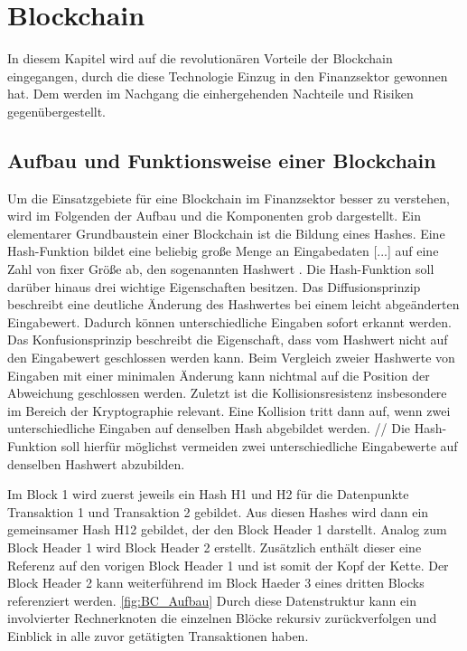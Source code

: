 \section{Blockchain}
In diesem Kapitel wird auf die revolutionären Vorteile der Blockchain 
eingegangen, durch die diese Technologie Einzug in den Finanzsektor gewonnen 
hat. Dem werden im Nachgang die einhergehenden Nachteile und Risiken gegenübergestellt. 

\subsection{Aufbau und Funktionsweise einer Blockchain}
Um die Einsatzgebiete für eine Blockchain im Finanzsektor besser zu verstehen,
wird im Folgenden der Aufbau und die Komponenten grob dargestellt.
Ein elementarer Grundbaustein einer Blockchain ist die Bildung eines Hashes.
\glqq Eine Hash-Funktion bildet eine beliebig große Menge an Eingabedaten [...] auf eine Zahl von 
fixer Größe ab, den sogenannten Hashwert\grqq{} \cite[p.~6]{fill2020blockchain}.
Die Hash-Funktion soll darüber hinaus drei wichtige Eigenschaften besitzen.
Das Diffusionsprinzip beschreibt eine deutliche Änderung des Hashwertes bei einem leicht
abgeänderten Eingabewert. Dadurch können unterschiedliche Eingaben sofort erkannt werden.
Das Konfusionsprinzip beschreibt die Eigenschaft, dass vom Hashwert nicht auf den Eingabewert
geschlossen werden kann. Beim Vergleich zweier Hashwerte von Eingaben mit einer minimalen
Änderung kann nichtmal auf die Position der Abweichung geschlossen werden.
Zuletzt ist die Kollisionsresistenz insbesondere im Bereich der Kryptographie relevant.
Eine Kollision tritt dann auf, wenn zwei unterschiedliche Eingaben auf denselben Hash abgebildet
werden. // Die Hash-Funktion soll hierfür möglichst vermeiden zwei unterschiedliche Eingabewerte
auf denselben Hashwert abzubilden.
\cite[p.~6ff]{fill2020blockchain} 

Im Block 1 wird zuerst jeweils ein Hash H1 und H2 für die Datenpunkte Transaktion 1 
und Transaktion 2 gebildet. Aus diesen Hashes wird dann ein gemeinsamer Hash H12 gebildet, 
der den Block Header 1 darstellt.
Analog zum Block Header 1 wird Block Header 2 erstellt. Zusätzlich enthält dieser eine
Referenz auf den vorigen Block Header 1 und ist somit der Kopf der Kette. Der Block Header 2
kann weiterführend im Block Haeder 3 eines dritten Blocks referenziert werden. 
\ref{fig:BC_Aufbau}
Durch diese Datenstruktur kann ein involvierter Rechnerknoten die einzelnen Blöcke rekursiv
zurückverfolgen und Einblick in alle zuvor getätigten Transaktionen haben.
\cite[p.~17f]{fill2020blockchain}

